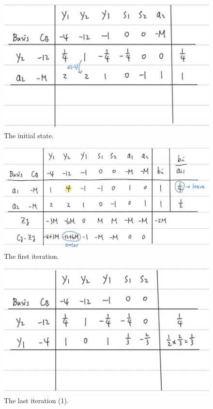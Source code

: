 \documentclass[a4paper,10pt]{article}
\begin{document}
\begin{enumerate}
\begin{enumerate}
{\begin{enumerate}
                \begin{figure}[H]
                    \centering
                    \includegraphics[scale=0.6]{./initial_state.PNG}
                    \caption{The initial state.}
                \end{figure}

                \begin{figure}[H]
                    \centering
                    \includegraphics[scale=0.6]{./first_iter.png}
                    \caption{The first iteration.}
                \end{figure}

                \begin{figure}[H]
                    \centering
                    \includegraphics[scale=0.6]{./last_iter_1.png}
                    \caption{The last iteration (1).}
                \end{figure}
                

\end{enumerate}}
\end{enumerate}
\end{enumerate}
\end{document}
